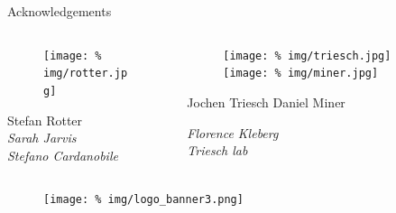 \begin{frame}{{\huge Acknowledgements}}
  \large
  \vspace{0.95cm}
  \begin{columns}
    \begin{column}{.33\textwidth}
      \minipage[c][0.3\textheight][s]{\columnwidth}
      
      \begin{figure}
        \centering
        \texttt{[image: \%
          img/rotter.jpg]} %
      \end{figure}
      \begin{center}
        Stefan Rotter\\[0.72cm]
        
        \itshape
        Sarah Jarvis\\
        Stefano Cardanobile
        
      \end{center}
      
      
      \endminipage      
    \end{column}
    \begin{column}{.49\textwidth}
      \minipage[c][0.3\textheight][s]{\columnwidth}
            \begin{figure}
        \centering
        \texttt{[image: \%
          img/triesch.jpg]} %
       \hfill
        \texttt{[image: \%
          img/miner.jpg]} %
      \end{figure}
      Jochen Triesch \hfill Daniel Miner \\[0.2cm]

      \begin{center}
        \itshape
        Florence Kleberg\\
        Triesch lab
      \end{center}

     
      \endminipage           
    \end{column}
  \end{columns}


  \vspace{2.7cm}

  \begin{figure}
    \centering
    \texttt{[image: \%
      img/logo\_banner3.png]} %
  \end{figure}

  
\end{frame}
